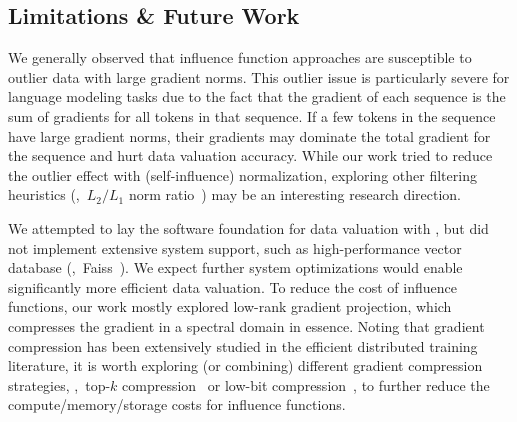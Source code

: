 \subsection{Limitations \& Future Work}
\label{sec:limitation}
We generally observed that influence function approaches are susceptible to outlier data with large gradient norms. This outlier issue is particularly severe for language modeling tasks due to the fact that the gradient of each sequence is the sum of gradients for all tokens in that sequence. If a few tokens in the sequence have large gradient norms, their gradients may dominate the total gradient for the sequence and hurt data valuation accuracy.  While our work tried to reduce the outlier effect with (self-influence) normalization, exploring other filtering heuristics (\eg,\ $L_2/L_1$ norm ratio~\cite{grosse2023studying}) may be an interesting research direction.

We attempted to lay the software foundation for data valuation with \software, but did not implement extensive system support, such as high-performance vector database (\eg,\ Faiss~\cite{johnson2019billion}). We expect further system optimizations would enable significantly more efficient data valuation. To reduce the cost of influence functions, our work mostly explored low-rank gradient projection, which compresses the gradient in a spectral domain in essence. Noting that gradient compression has been extensively studied in the efficient distributed training literature, it is worth exploring (or combining) different gradient compression strategies, \eg,\ top-$k$ compression~\cite{shi2019understanding} or low-bit compression~\cite{Wen2017TernGradTG}, to further reduce the compute/memory/storage costs for influence functions.